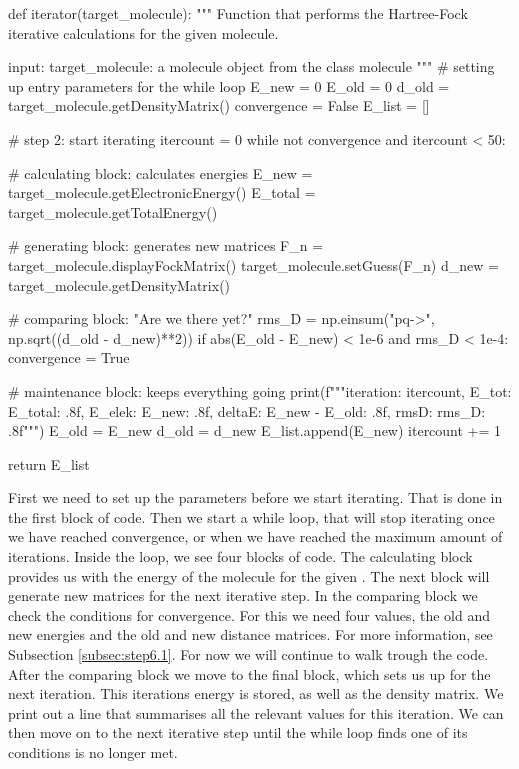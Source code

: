\begin{python}[caption={iteration sequence},label={ls:Listing 6}]
    def iterator(target_molecule):
        """
        Function that performs the Hartree-Fock iterative calculations 
        for the given molecule.
        
        input:
        target_molecule: a molecule object from the class molecule
        """
        # setting up entry parameters for the while loop
        E_new = 0  
        E_old = 0
        d_old = target_molecule.getDensityMatrix()
        convergence = False
        E_list = []

        # step 2: start iterating
        itercount = 0
        while not convergence and itercount < 50:

            # calculating block: calculates energies
            E_new = target_molecule.getElectronicEnergy()
            E_total = target_molecule.getTotalEnergy()

            # generating block: generates new matrices
            F_n =  target_molecule.displayFockMatrix()
            target_molecule.setGuess(F_n)
            d_new = target_molecule.getDensityMatrix()

            # comparing block: "Are we there yet?"
            rms_D = np.einsum("pq->", np.sqrt((d_old - d_new)**2))
            if abs(E_old - E_new) < 1e-6 and rms_D < 1e-4:
                convergence = True


            # maintenance block: keeps everything going
            print(f"""iteration: {itercount}, E_tot: {E_total: .8f}, 
                        E_elek: {E_new: .8f}, 
                        deltaE: {E_new - E_old: .8f}, 
                        rmsD: {rms_D: .8f}""")
            E_old = E_new
            d_old = d_new
            E_list.append(E_new)
            itercount += 1
        
        return E_list
\end{python}

First we need to set up the parameters before we start iterating. That is done in 
the first block of code. Then we start a while loop, that will stop iterating once
we have reached convergence, or when we have reached the maximum amount of 
iterations. Inside the loop, we see four blocks of code. The calculating block 
provides us with the energy of the molecule for the given 
. The next block will generate new matrices for 
the next iterative step. In the comparing block we check the conditions for 
convergence. For this we need four values, the old and new energies and the old 
and new distance matrices. For more information, see Subsection 
\ref{subsec:step6.1}. For now we will continue to walk trough the code. 
After the comparing block we move to the final block, which sets us up for the 
next iteration. This iterations energy is stored, as well as the density matrix. 
We print out a line that summarises all the relevant values for this iteration. 
We can then move on to the next iterative step until the while loop finds one of 
its conditions is no longer met.
 

